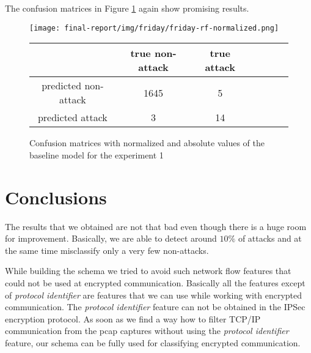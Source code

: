\documentclass{article}
\begin{document}
The confusion matrices in Figure \ref{fig-exp2-transcriptions} again show promising results.

\begin{figure}[h!]
    \centering
    \texttt{[image: final-report/img/friday/friday-rf-normalized.png]}

    \centering
    \begin{tabular}{ |c|c|c|c|c|c|c| }
     \hline
      & true non-attack & true attack \\
     \hline
     predicted non-attack & 1645 & 5 \\
     \hline
     predicted attack & 3 & 14 \\
     \hline
    \end{tabular}
    \caption{Confusion matrices with normalized and absolute values of the baseline model for the experiment 1}
    \label{fig-exp2-transcriptions}
\end{figure}




\clearpage
\section{Conclusions}
The results that we obtained are not that bad even though there is a huge room for improvement. Basically, we are able to detect around $10\%$ of attacks and at the same time misclassify only a very few non-attacks.

While building the schema we tried to avoid such network flow features that could not be used at encrypted communication. Basically all the features except of \textit{protocol identifier} are features that we can use while working with encrypted communication. The \textit{protocol identifier} feature can not be obtained in the IPSec encryption protocol. As soon as we find a way how to filter TCP/IP communication from the pcap captures without using the \textit{protocol identifier} feature, our schema can be fully used for classifying encrypted communication.



\clearpage




% 


\end{document}
